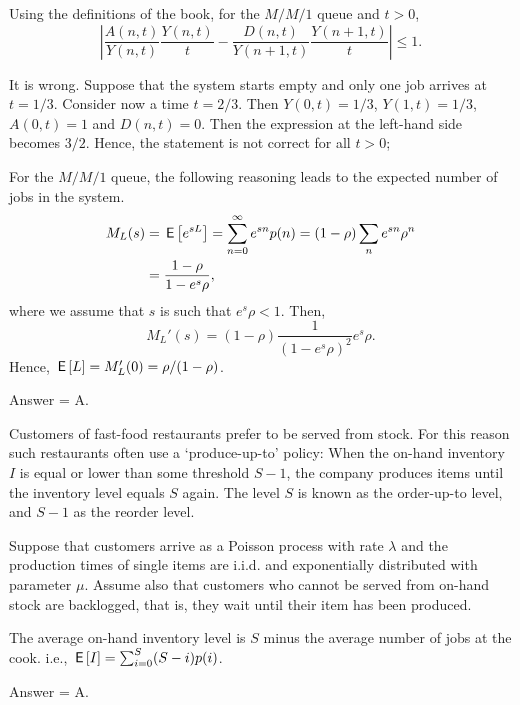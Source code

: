 \begin{exercise}[201803]
Using the definitions of the book, for the $M/M/1$ queue and $t>0$, 
\begin{equation*}
\left| \frac{A(n,t)}{Y(n,t)}\frac{Y(n,t)}t - \frac{D(n,t)}{Y(n+1,t)}\frac{Y(n+1,t)}t \right| \leq 1. 
\end{equation*}
\begin{solution}
  It is wrong.
  Suppose that the system starts empty and only one job arrives at $t=1/3$.
  Consider now a time $t=2/3$.
  Then $Y(0,t)=1/3$, $Y(1,t)=1/3$, $A(0,t)=1$ and $D(n,t)=0$.
  Then the expression at the left-hand side becomes $3/2$.  Hence, the statement is not correct for all $t>0$;
\end{solution}
\end{exercise}

\begin{exercise}[201803]
For the $M/M/1$ queue, the following reasoning leads to the expected number of jobs in the system.
\begin{equation*}
 \begin{split}
 M_L(s) 
&= \,\mathsf{E}\left[e^{s L}\right] = \sum_{n=0}^\infty e^{s n}p(n) = (1-\rho) \sum_n e^{s n} \rho^n \\
&=\frac{1-\rho}{1-e^{s}\rho},
 \end{split}
\end{equation*}
where we assume that $s$ is such that $e^s \rho < 1$. Then, 
\begin{equation*}
 M_L'(s) = (1-\rho) \frac{1}{(1-e^s\rho)^2} e^s \rho.
\end{equation*}
Hence, $\,\mathsf{E}\left[L\right] = M_L'(0) = \rho/(1-\rho)$.
\begin{solution}
Answer = A.
\end{solution}
\end{exercise}

\begin{exercise}[201803]
Customers of fast-food restaurants prefer to be served from stock. For this reason such
restaurants often use a `produce-up-to' policy: When the on-hand inventory $I$ is equal or lower than some threshold $S-1$, the company produces items until the inventory level equals $S$ again. The level $S$ is known as the order-up-to level, and $S-1$ as the reorder level.

Suppose that customers arrive as a Poisson process with rate $\lambda$
and the production times of single items are i.i.d. and exponentially
distributed with parameter $\mu$. Assume also that customers who
cannot be served from on-hand stock are backlogged, that is, they wait
until their item has been produced. 

The average on-hand inventory level is $S$ minus the average number of jobs at the cook. i.e., $\,\mathsf{E}\left[I\right] = \sum_{i=0}^{S} (S-i) p(i)$. 
\begin{solution}
Answer = A.
\end{solution}
\end{exercise}

